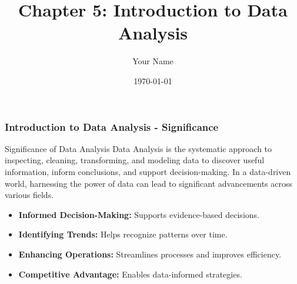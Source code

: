 \documentclass{beamer}
\title{Chapter 5: Introduction to Data Analysis}
\author{Your Name}
\institute{Your Institution}
\date{\today}
\begin{document}
\frame{\titlepage}

\begin{frame}[fragile]
    \frametitle{Introduction to Data Analysis - Significance}
    \begin{block}{Significance of Data Analysis}
        Data Analysis is the systematic approach to inspecting, cleaning, transforming, and modeling data to discover useful information, inform conclusions, and support decision-making. In a data-driven world, harnessing the power of data can lead to significant advancements across various fields.
    \end{block}
    
    \begin{itemize}
        \item \textbf{Informed Decision-Making:} Supports evidence-based decisions.
        \item \textbf{Identifying Trends:} Helps recognize patterns over time.
        \item \textbf{Enhancing Operations:} Streamlines processes and improves efficiency.
        \item \textbf{Competitive Advantage:} Enables data-informed strategies.
    \end{itemize}
\end{frame}
\end{document}
